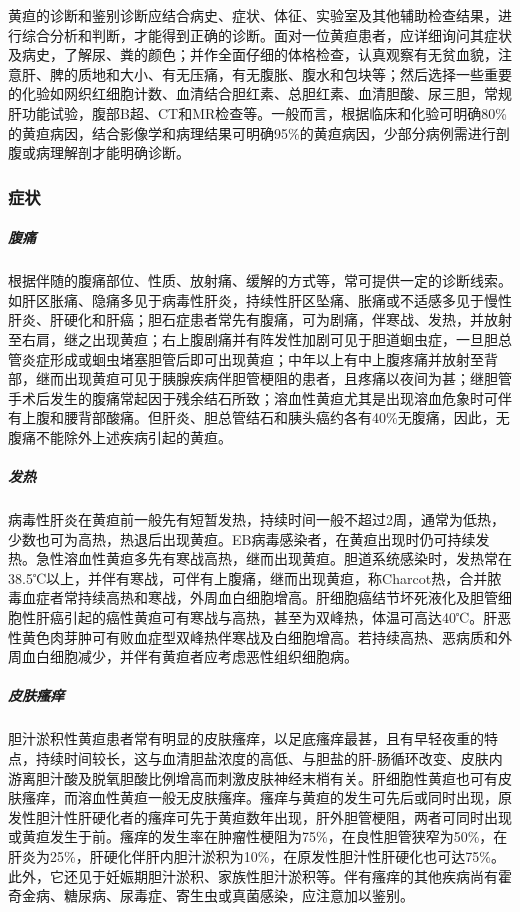 黄疸的诊断和鉴别诊断应结合病史、症状、体征、实验室及其他辅助检查结果，进行综合分析和判断，才能得到正确的诊断。面对一位黄疸患者，应详细询问其症状及病史，了解尿、粪的颜色；并作全面仔细的体格检查，认真观察有无贫血貌，注意肝、脾的质地和大小、有无压痛，有无腹胀、腹水和包块等；然后选择一些重要的化验如网织红细胞计数、血清结合胆红素、总胆红素、血清胆酸、尿三胆，常规肝功能试验，腹部B超、CT和MR检查等。一般而言，根据临床和化验可明确80\%的黄疸病因，结合影像学和病理结果可明确95\%的黄疸病因，少部分病例需进行剖腹或病理解剖才能明确诊断。

\subsubsection{症状}

\subparagraph{腹痛}

根据伴随的腹痛部位、性质、放射痛、缓解的方式等，常可提供一定的诊断线索。如肝区胀痛、隐痛多见于病毒性肝炎，持续性肝区坠痛、胀痛或不适感多见于慢性肝炎、肝硬化和肝癌；胆石症患者常先有腹痛，可为剧痛，伴寒战、发热，并放射至右肩，继之出现黄疸；右上腹剧痛并有阵发性加剧可见于胆道蛔虫症，一旦胆总管炎症形成或蛔虫堵塞胆管后即可出现黄疸；中年以上有中上腹疼痛并放射至背部，继而出现黄疸可见于胰腺疾病伴胆管梗阻的患者，且疼痛以夜间为甚；继胆管手术后发生的腹痛常起因于残余结石所致；溶血性黄疸尤其是出现溶血危象时可伴有上腹和腰背部酸痛。但肝炎、胆总管结石和胰头癌约各有40\%无腹痛，因此，无腹痛不能除外上述疾病引起的黄疸。

\subparagraph{发热}

病毒性肝炎在黄疸前一般先有短暂发热，持续时间一般不超过2周，通常为低热，少数也可为高热，热退后出现黄疸。EB病毒感染者，在黄疸出现时仍可持续发热。急性溶血性黄疸多先有寒战高热，继而出现黄疸。胆道系统感染时，发热常在38.5℃以上，并伴有寒战，可伴有上腹痛，继而出现黄疸，称Charcot热，合并脓毒血症者常持续高热和寒战，外周血白细胞增高。肝细胞癌结节坏死液化及胆管细胞性肝癌引起的癌性黄疸可有寒战与高热，甚至为双峰热，体温可高达40℃。肝恶性黄色肉芽肿可有败血症型双峰热伴寒战及白细胞增高。若持续高热、恶病质和外周血白细胞减少，并伴有黄疸者应考虑恶性组织细胞病。

\subparagraph{皮肤瘙痒}

胆汁淤积性黄疸患者常有明显的皮肤瘙痒，以足底瘙痒最甚，且有早轻夜重的特点，持续时间较长，这与血清胆盐浓度的高低、与胆盐的肝-肠循环改变、皮肤内游离胆汁酸及脱氧胆酸比例增高而刺激皮肤神经末梢有关。肝细胞性黄疸也可有皮肤瘙痒，而溶血性黄疸一般无皮肤瘙痒。瘙痒与黄疸的发生可先后或同时出现，原发性胆汁性肝硬化者的瘙痒可先于黄疸数年出现，肝外胆管梗阻，两者可同时出现或黄疸发生于前。瘙痒的发生率在肿瘤性梗阻为75\%，在良性胆管狭窄为50\%，在肝炎为25\%，肝硬化伴肝内胆汁淤积为10\%，在原发性胆汁性肝硬化也可达75\%。此外，它还见于妊娠期胆汁淤积、家族性胆汁淤积等。伴有瘙痒的其他疾病尚有霍奇金病、糖尿病、尿毒症、寄生虫或真菌感染，应注意加以鉴别。

